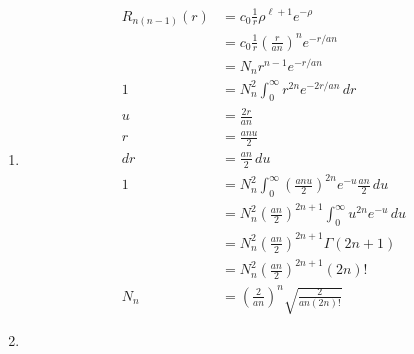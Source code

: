 \documentclass{article}
\begin{document}
\begin{enumerate}
  \item

        \begin{align*}
          R_{n (n - 1)}(r) & = c_0 \frac{1}{r} \rho^{\ell + 1} e^{-\rho}                                           \\
                           & = c_0 \frac{1}{r} \left( \frac{r}{a n} \right)^n e^{-r / a n}                         \\
                           & = N_n r^{n - 1} e^{-r / a n}                                                          \\
          1                & = N_n^2 \int_0^\infty r^{2 n} e^{-2 r / a n} \,d r                                    \\
          u                & = \frac{2 r}{a n}                                                                     \\
          r                & = \frac{a n u}{2}                                                                     \\
          d r              & = \frac{a n}{2} \,d u                                                                 \\
          1                & = N_n^2 \int_0^\infty \left( \frac{a n u}{2} \right)^{2 n} e^{-u} \frac{a n}{2} \,d u \\
                           & = N_n^2 \left( \frac{a n}{2} \right)^{2 n + 1} \int_0^\infty u^{2 n} e^{-u} \,d u     \\
                           & = N_n^2 \left( \frac{a n}{2} \right)^{2 n + 1} \Gamma(2 n + 1)                        \\
                           & = N_n^2 \left( \frac{a n}{2} \right)^{2 n + 1} (2 n)!                                 \\
          N_n              & = \left( \frac{2}{a n} \right)^n \sqrt{\frac{2}{a n (2 n)!}}
        \end{align*}

  \item


\end{enumerate}
\end{document}
